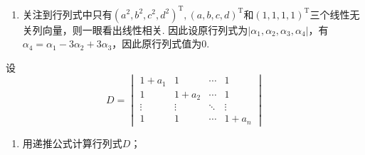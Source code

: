 \begin{exercise}
\begin{exgroup}
\begin{answer}
\begin{enumerate}
                \item 关注到行列式中只有$(a^2, b^2, c^2, d^2)^\mathrm{T}, (a, b, c, d)^\mathrm{T}$和$(1, 1, 1, 1)^\mathrm{T}$三个线性无关列向量，则一眼看出线性相关. 因此设原行列式为$|\alpha_1, \alpha_2, \alpha_3, \alpha_4|$，有$\alpha_4=\alpha_1-3\alpha_2+3\alpha_3$，因此原行列式值为0.
            \end{enumerate}
        \end{answer}

        \item 设
        \[ D=\begin{vmatrix}
                1+a_1  & 1      & \cdots & 1      \\
                1      & 1+a_2  & \cdots & 1      \\
                \vdots & \vdots & \ddots & \vdots \\
                1      & 1      & \cdots & 1+a_n
            \end{vmatrix} \]
        \begin{enumerate}
            \item 用递推公式计算行列式$D$；


\end{enumerate}
\end{exgroup}
\end{exercise}

